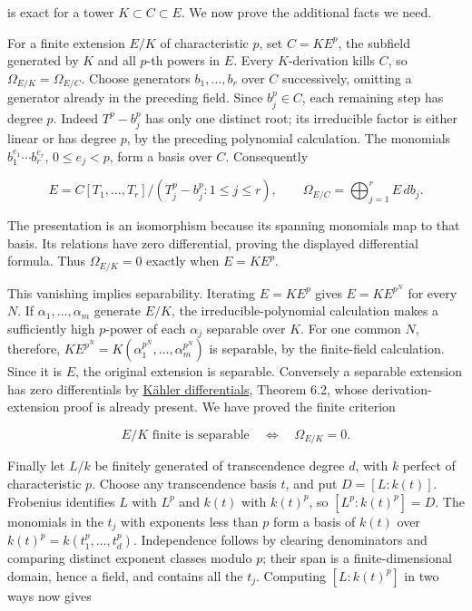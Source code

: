 \documentclass[
]{article}
\begin{document}
is exact for a tower \(K\subset C\subset E\). We now prove the
additional facts we need.

For a finite extension \(E/K\) of characteristic \(p\), set \(C=K E^p\),
the subfield generated by \(K\) and all \(p\)-th powers in \(E\). Every
\(K\)-derivation kills \(C\), so \(\Omega_{E/K}=\Omega_{E/C}\). Choose
generators \(b_1,\ldots,b_r\) over \(C\) successively, omitting a
generator already in the preceding field. Since \(b_j^p\in C\), each
remaining step has degree \(p\). Indeed \(T^p-b_j^p\) has only one
distinct root; its irreducible factor is either linear or has degree
\(p\), by the preceding polynomial calculation. The monomials
\(b_1^{e_1}\cdots b_r^{e_r}\), \(0\le e_j<p\), form a basis over \(C\).
Consequently

\[
E=C[T_1,\ldots,T_r]/(T_j^p-b_j^p:1\le j\le r),
\qquad \Omega_{E/C}=\bigoplus_{j=1}^r E\,db_j.
\]

The presentation is an isomorphism because its spanning monomials map to
that basis. Its relations have zero differential, proving the displayed
differential formula. Thus \(\Omega_{E/K}=0\) exactly when \(E=K E^p\).

This vanishing implies separability. Iterating \(E=K E^p\) gives
\(E=K E^{p^N}\) for every \(N\). If \(\alpha_1,\ldots,\alpha_m\)
generate \(E/K\), the irreducible-polynomial calculation makes a
sufficiently high \(p\)-power of each \(\alpha_j\) separable over \(K\).
For one common \(N\), therefore,
\(K E^{p^N}=K(\alpha_1^{p^N},\ldots,\alpha_m^{p^N})\) is separable, by
the finite-field calculation. Since it is \(E\), the original extension
is separable. Conversely a separable extension has zero differentials by
\href{../prerequisites/AG-CA/AG-CA-16.html}{Kähler differentials},
Theorem 6.2, whose derivation-extension proof is already present. We
have proved the finite criterion

\[
E/K\text{ finite is separable}\quad\Longleftrightarrow\quad
\Omega_{E/K}=0.
\tag{5a}
\]

Finally let \(L/k\) be finitely generated of transcendence degree \(d\),
with \(k\) perfect of characteristic \(p\). Choose any transcendence
basis \(t\), and put \(D=[L:k(t)]\). Frobenius identifies \(L\) with
\(L^p\) and \(k(t)\) with \(k(t)^p\), so \([L^p:k(t)^p]=D\). The
monomials in the \(t_j\) with exponents less than \(p\) form a basis of
\(k(t)\) over \(k(t)^p=k(t_1^p,\ldots,t_d^p)\). Independence follows by
clearing denominators and comparing distinct exponent classes modulo
\(p\); their span is a finite-dimensional domain, hence a field, and
contains all the \(t_j\). Computing \([L:k(t)^p]\) in two ways now gives
\end{document}
